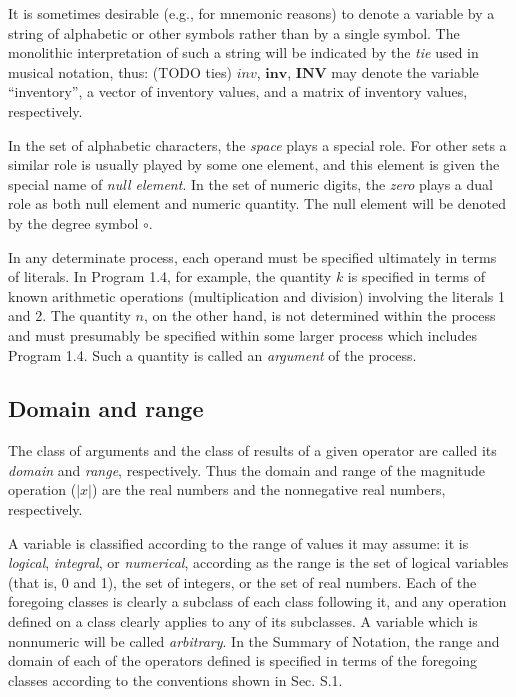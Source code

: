 \par It is sometimes desirable (e.g., for mnemonic reasons) to denote a variable by a string of alphabetic or other symbols rather than by a single symbol. The monolithic interpretation of such a string will be indicated by the \textit{tie} used in musical notation, thus:
(TODO ties) $inv$, $\mathbf{inv}$, $\mathbf{INV}$ may denote the variable ``inventory'', a vector of inventory values, and a matrix of inventory values, respectively.

\par In the set of alphabetic characters, the \textit{space} plays a special role. For other sets a similar role is usually played by some one element, and this element is given the special name of \textit{null element}. In the set of numeric digits, the \textit{zero} plays a dual role as both null element and numeric quantity. The null element will be denoted by the degree symbol $∘$.

\par In any determinate process, each operand must be specified ultimately in terms of literals. In Program 1.4, for example, the quantity $k$ is specified in terms of known arithmetic operations (multiplication and division) involving the literals 1 and 2. The quantity $n$, on the other hand, is not determined within the process and must presumably be specified within some larger process which includes Program 1.4. Such a quantity is called an \textit{argument} of the process.

\subsection*{Domain and range}

\par The class of arguments and the class of results of a given operator are called its \textit{domain} and \textit{range}, respectively. Thus the domain and range of the magnitude operation ($|x|$) are the real numbers and the nonnegative real numbers, respectively.

\par A variable is classified according to the range of values it may assume: it is \textit{logical}, \textit{integral}, or \textit{numerical}, according as the range is the set of logical variables (that is, 0 and 1), the set of integers, or the set of real numbers. Each of the foregoing classes is clearly a subclass of each class following it, and any operation defined on a class clearly applies to any of its subclasses. A variable which is nonnumeric will be called \textit{arbitrary}. In the Summary of Notation, the range and domain of each of the operators defined is specified in terms of the foregoing classes according to the conventions shown in Sec. S.1.

